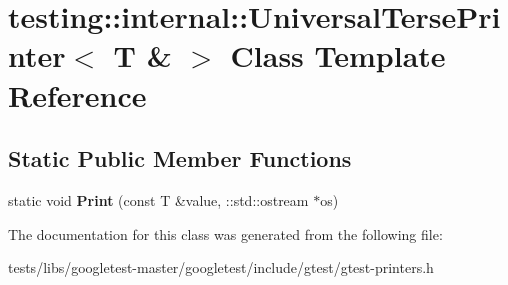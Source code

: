 \hypertarget{classtesting_1_1internal_1_1UniversalTersePrinter_3_01T_01_6_01_4}{}\section{testing\+:\+:internal\+:\+:Universal\+Terse\+Printer$<$ T \& $>$ Class Template Reference}
\label{classtesting_1_1internal_1_1UniversalTersePrinter_3_01T_01_6_01_4}
\subsection*{Static Public Member Functions}
\begin{DoxyCompactItemize}
\item 
\mbox{\label{classtesting_1_1internal_1_1UniversalTersePrinter_3_01T_01_6_01_4_a931f93cc52a3046706c87d0a90640483}} 
static void {\bfseries Print} (const T \&value, \+::std\+::ostream $\ast$os)
\end{DoxyCompactItemize}


The documentation for this class was generated from the following file\+:\begin{DoxyCompactItemize}
\item 
tests/libs/googletest-\/master/googletest/include/gtest/gtest-\/printers.\+h\end{DoxyCompactItemize}
